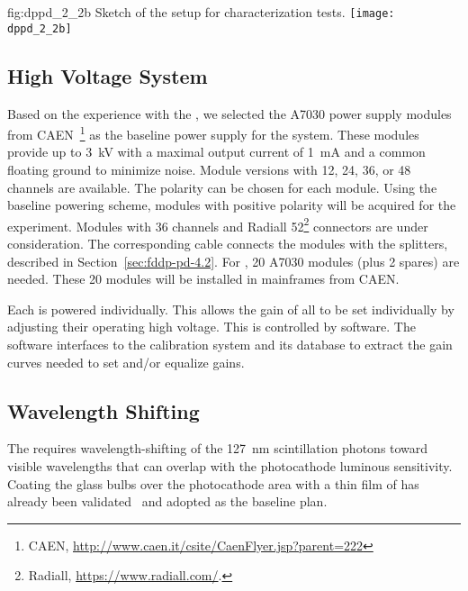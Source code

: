 \begin{dunefigure}{fig:dppd_2_2b}
{Sketch of the setup for  characterization tests.}
\texttt{[image: dppd\_2\_2b]}
\end{dunefigure}


\subsection{High Voltage System}
\label{sec:dp-pds-HV}

Based on the experience with the , we selected the A7030 power supply modules from CAEN~\footnote{CAEN\texttrademark{}, \url{http://www.caen.it/csite/CaenFlyer.jsp?parent=222}}  as the baseline power supply for the   system. 
These modules provide up to \SI{3}{kV} with a maximal output current of \SI{1}{mA} and a common floating ground to minimize noise. Module versions with \num{12}, \num{24}, \num{36}, or \num{48}  channels are available. The  polarity can be chosen for each module. Using the baseline  powering scheme, modules with positive  polarity will be acquired for the experiment. Modules with \num{36}  channels and Radiall \num{52}\footnote{Radiall\texttrademark{}, \url{https://www.radiall.com/}.}  connectors are under consideration. The corresponding  cable connects the modules with the  splitters, described in Section~\ref{sec:fddp-pd-4.2}. For \dpnumpmtch {}, \num{20} A7030 modules (plus \num{2} spares) are needed. These \num{20}  modules will be installed in mainframes from CAEN.

Each  is powered individually.  This allows the gain of all  to be set individually by adjusting their operating high voltage.
This is controlled by software. The software interfaces to the  calibration system and its database to extract the gain curves needed to set and/or equalize gains.

\subsection{Wavelength Shifting}
\label{sec:dppd-wls}

The \dual {} requires wavelength-shifting of the \SI{127}{nm} scintillation photons toward visible wavelengths that can overlap with the photocathode luminous sensitivity. Coating the  glass bulbs over the photocathode area with a thin film of  has already been validated~\cite{Francini:2013lua} and adopted as the baseline plan. 

